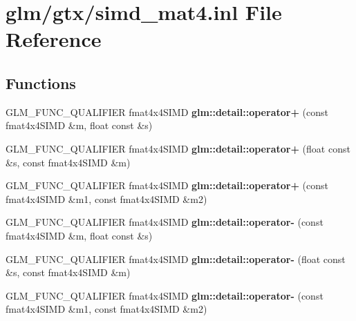 \hypertarget{simd__mat4_8inl}{\section{glm/gtx/simd\-\_\-mat4.inl File Reference}
\label{simd__mat4_8inl}
}
\subsection*{Functions}
\begin{DoxyCompactItemize}
\item 
\hypertarget{namespaceglm_1_1detail_a629935a47dc01b2cd4aa5598f364e359}{G\-L\-M\-\_\-\-F\-U\-N\-C\-\_\-\-Q\-U\-A\-L\-I\-F\-I\-E\-R fmat4x4\-S\-I\-M\-D {\bfseries glm\-::detail\-::operator+} (const fmat4x4\-S\-I\-M\-D \&m, float const \&s)}\label{namespaceglm_1_1detail_a629935a47dc01b2cd4aa5598f364e359}

\item 
\hypertarget{namespaceglm_1_1detail_a4b632f8b13f05642eea7d551815f0923}{G\-L\-M\-\_\-\-F\-U\-N\-C\-\_\-\-Q\-U\-A\-L\-I\-F\-I\-E\-R fmat4x4\-S\-I\-M\-D {\bfseries glm\-::detail\-::operator+} (float const \&s, const fmat4x4\-S\-I\-M\-D \&m)}\label{namespaceglm_1_1detail_a4b632f8b13f05642eea7d551815f0923}

\item 
\hypertarget{namespaceglm_1_1detail_a9f20d29252cc62031ba3b05aff1d2fe8}{G\-L\-M\-\_\-\-F\-U\-N\-C\-\_\-\-Q\-U\-A\-L\-I\-F\-I\-E\-R fmat4x4\-S\-I\-M\-D {\bfseries glm\-::detail\-::operator+} (const fmat4x4\-S\-I\-M\-D \&m1, const fmat4x4\-S\-I\-M\-D \&m2)}\label{namespaceglm_1_1detail_a9f20d29252cc62031ba3b05aff1d2fe8}

\item 
\hypertarget{namespaceglm_1_1detail_aab9939909f4d23c042e7d438dda5caca}{G\-L\-M\-\_\-\-F\-U\-N\-C\-\_\-\-Q\-U\-A\-L\-I\-F\-I\-E\-R fmat4x4\-S\-I\-M\-D {\bfseries glm\-::detail\-::operator-\/} (const fmat4x4\-S\-I\-M\-D \&m, float const \&s)}\label{namespaceglm_1_1detail_aab9939909f4d23c042e7d438dda5caca}

\item 
\hypertarget{namespaceglm_1_1detail_a470e32d5d0337f7714ecb8c8c9ad368d}{G\-L\-M\-\_\-\-F\-U\-N\-C\-\_\-\-Q\-U\-A\-L\-I\-F\-I\-E\-R fmat4x4\-S\-I\-M\-D {\bfseries glm\-::detail\-::operator-\/} (float const \&s, const fmat4x4\-S\-I\-M\-D \&m)}\label{namespaceglm_1_1detail_a470e32d5d0337f7714ecb8c8c9ad368d}

\item 
\hypertarget{namespaceglm_1_1detail_a00972f91f088e7ab0f96ebdc6e8bec41}{G\-L\-M\-\_\-\-F\-U\-N\-C\-\_\-\-Q\-U\-A\-L\-I\-F\-I\-E\-R fmat4x4\-S\-I\-M\-D {\bfseries glm\-::detail\-::operator-\/} (const fmat4x4\-S\-I\-M\-D \&m1, const fmat4x4\-S\-I\-M\-D \&m2)}\label{namespaceglm_1_1detail_a00972f91f088e7ab0f96ebdc6e8bec41}


\end{DoxyCompactItemize}
